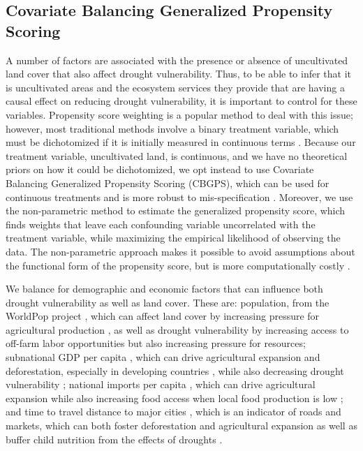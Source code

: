 \documentclass{article}
\begin{document}
\subsection{Covariate Balancing Generalized Propensity Scoring}
A number of factors are associated with the presence or absence of uncultivated land cover that also affect drought vulnerability.  Thus, to be able to infer that it is uncultivated areas and the ecosystem services they provide that are having a causal effect on reducing drought vulnerability, it is important to control for these variables.  Propensity score weighting is a popular method to deal with this issue; however, most traditional methods involve a binary treatment variable, which must be dichotomized if it is initially measured in continuous terms \cite{Hirano2003, Robins2000}.  Because our treatment variable, uncultivated land, is continuous, and we have no theoretical priors on how it could be dichotomized, we opt instead to use Covariate Balancing Generalized Propensity Scoring (CBGPS), which can be used for continuous treatments and is more robust to mis-specification \cite{Fong2018}.  Moreover, we use the non-parametric method to estimate the generalized propensity score, which finds weights that leave each confounding variable uncorrelated with the treatment variable, while maximizing the empirical likelihood of observing the data.  The non-parametric approach makes it possible to avoid assumptions about the functional form of the propensity score, but is more computationally costly \cite{Fong2018}.

We balance for demographic and economic factors that can influence both drought vulnerability as well as land cover.  These are: population, from the WorldPop project \cite{Tatem2017}, which can affect land cover by increasing pressure for agricultural production \cite{ouedraogo2010land}, as well as drought vulnerability by increasing access to off-farm labor opportunities but also increasing pressure for resources; subnational GDP per capita \cite{Kummu2018}, which can drive agricultural expansion and deforestation, especially in developing countries \cite{culas2012redd}, while also decreasing drought vulnerability \cite{Carrao2016}; national imports per capita \cite{WorldBank2017}, which can drive agricultural expansion \cite{Meyfroidt2013} while also increasing food access when local food production is low \cite{janssens2020global}; and time to travel distance to major cities \cite{Weiss2018, Uchida2008}, which is an indicator of roads and markets, which can both foster deforestation and agricultural expansion \cite{barber2014roads} as well as buffer child nutrition from the effects of droughts \cite{Shively2017}.
\end{document}
